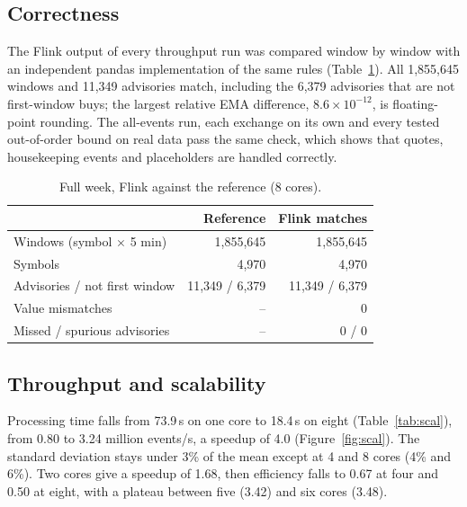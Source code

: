 \documentclass[sigconf]{acmart}
\begin{document}
\subsection{Correctness}
The Flink output of every throughput run was compared window by window with an independent pandas implementation of the same rules (Table~\ref{tab:correct}). All 1,855,645 windows and 11,349 advisories match, including the 6,379 advisories that are not first-window buys; the largest relative EMA difference, $8.6\times10^{-12}$, is floating-point rounding. The all-events run, each exchange on its own and every tested out-of-order bound on real data pass the same check, which shows that quotes, housekeeping events and placeholders are handled correctly.

\begin{table}[t]
  \caption{Full week, Flink against the reference (8 cores).}
  \label{tab:correct}
  \small
  \begin{tabular}{lrr}
    \toprule
    & Reference & Flink matches\\
    \midrule
    Windows (symbol $\times$ 5 min) & 1,855,645 & 1,855,645\\
    Symbols                         &     4,970 &     4,970\\
    Advisories / not first window   & 11,349 / 6,379 & 11,349 / 6,379\\
    Value mismatches & -- & 0\\
    Missed / spurious advisories & -- & 0 / 0\\
    \bottomrule
  \end{tabular}
\end{table}

\subsection{Throughput and scalability}\label{sec:scal}
Processing time falls from 73.9\,s on one core to 18.4\,s on eight (Table~\ref{tab:scal}), from 0.80 to 3.24 million events/s, a speedup of 4.0 (Figure~\ref{fig:scal}). The standard deviation stays under 3\% of the mean except at 4 and 8 cores (4\% and 6\%). Two cores give a speedup of 1.68, then efficiency falls to 0.67 at four and 0.50 at eight, with a plateau between five (3.42) and six cores (3.48).
\end{document}
